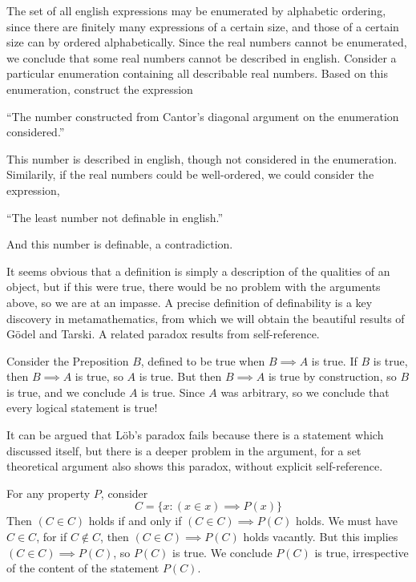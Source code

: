 \begin{example}
    The set of all english expressions may be enumerated by alphabetic ordering, since there are finitely many expressions of a certain size, and those of a certain size can by ordered alphabetically. Since the real numbers cannot be enumerated, we conclude that some real numbers cannot be described in english. Consider a particular enumeration containing all describable real numbers. Based on this enumeration, construct the expression
    \begin{center}
        ``The number constructed from Cantor's diagonal argument on the enumeration considered.''
    \end{center}
    This number is described in english, though not considered in the enumeration. Similarily, if the real numbers could be well-ordered, we could consider the expression,
    \begin{center}
        ``The least number not definable in english.''
    \end{center}
    And this number is definable, a contradiction.
\end{example}

It seems obvious that a definition is simply a description of the qualities of an object, but if this were true, there would be no problem with the arguments above, so we are at an impasse. A precise definition of definability is a key discovery in metamathematics, from which we will obtain the beautiful results of G\"{o}del and Tarski. A related paradox results from self-reference.

\begin{example}[L\"{o}b]
    Consider the Preposition $B$, defined to be true when $B \implies A$ is true. If $B$ is true, then $B \implies A$ is true, so $A$ is true. But then $B \implies A$ is true by construction, so $B$ is true, and we conclude $A$ is true. Since $A$ was arbitrary, so we conclude that every logical statement is true!
\end{example}

It can be argued that L\"{o}b's paradox fails because there is a statement which discussed itself, but there is a deeper problem in the argument, for a set theoretical argument also shows this paradox, without explicit self-reference.

\begin{example}[Curry]
    For any property $P$, consider
    \[ C = \{ x : (x \in x) \implies P(x) \} \]
    Then $(C \in C)$ holds if and only if $(C \in C) \implies P(C)$ holds. We must have $C \in C$, for if $C \not \in C$, then $(C \in C) \implies P(C)$ holds vacantly. But this implies $(C \in C) \implies P(C)$, so $P(C)$ is true. We conclude $P(C)$ is true, irrespective of the content of the statement $P(C)$.
\end{example}

